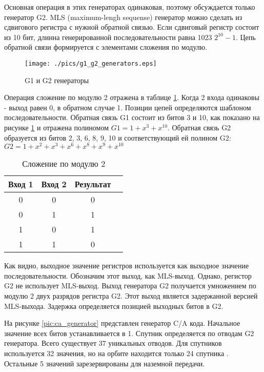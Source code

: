 Основная операция в этих генераторах одинаковая, поэтому обсуждается только генератор G2. MLS (maximum-lengh sequense)
генератор можно сделать из сдвигового регистра с нужной обратной связью. Если сдвиговый регистр состоит из 10 бит,
длинна генерированной последовательности равна 1023 ${2^{10}-1}$. Цепь обратной связи формируется с элементами сложения
по модулю.

\begin{figure}[H]
\begin{center}
\texttt{[image: ./pics/g1\_g2\_generators.eps]}
\end{center}
\caption{G1 и G2 генераторы}
\label{pic:g1_g2_generators}
\end{figure}

Операция сложение по модулю 2 отражена в таблице \ref{tab:mod2}. Когда 2 входа одинаковы - выход равен 0, в обратном
случае 1. Позиции цепей определяются шаблоном последовательности. Обратная связь G1 состоит из битов 3 и 10, как 
показано на рисунке \ref{pic:g1_g2_generators} и отражена полиномом ${G1=1 + x^{3} + x^{10}}$. Обратная связь G2
образуется из битов 2, 3, 6, 8, 9, 10 и соответствующий ей полином G2:
${G2=1 + x^{2} + x^{3} + x^{6} + x^{8} + x^{9} + x^{10}}$ 

\begin{table}[H]
\begin{center}
\caption{Сложение по модулю 2}
\label{tab:mod2}
\begin{tabular}{|c|c|c|c|}
	\hline
		Вход 1 & Вход 2 & Результат \\
	\hline
		0 & 0 & 0 \\
	\hline
		0 & 1 & 1 \\
	\hline
		1 & 0 & 1 \\
	\hline
		1 & 1 & 0 \\
	\hline
\end{tabular}
\end{center}
\end{table}

Как видно, выходное значение регистров используется как выходное значение последовательности. Обозначим этот выход, как
MLS-выход. Однако, регистор G2 не использует MLS-выход. Выход генератора G2 получается умножением по модулю 2
двух разрядов регистра G2. Этот выход является задержанной версией MLS-выхода. Задержка определяется позицией выходных
битов в G2.

На рисунке \ref{pic:ca_generator} представлен генератор C/A кода. Начальное значение всех битов устанавливается в 1.
Спутник определяется по отводам G2 генератора. Всего существует 37 уникальных отводов. Для спутников используется 32
значения, но на орбите находится только 24 спутника \cite{tsui}. Остальные 5 значений зарезервированы для наземной
передачи.

